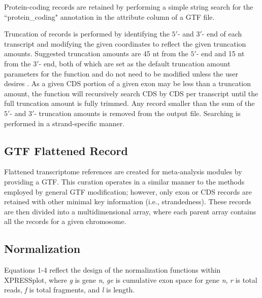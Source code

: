 \documentclass[10pt, oneside]{article}
\begin{document}
Protein-coding records are retained by performing a simple string search for the ``protein\_coding" annotation in the attribute column of a GTF file. \par

Truncation of records is performed by identifying the $5'$- and $3'$- end of each transcript and modifying the given coordinates to reflect the given truncation amounts. Suggested truncation amounts are 45 nt from the $5'$- end and 15 nt from the $3'$- end, both of which are set as the default truncation amount parameters for the function and do not need to be modified unless the user desires \cite{ingolia_meth}. As a given CDS portion of a given exon may be less than a truncation amount, the function will recursively search CDS by CDS per transcript until the full truncation amount is fully trimmed. Any record smaller than the sum of the $5'$- and $3'$- truncation amounts is removed from the output file. Searching is performed in a strand-specific manner. \par

\subsection{GTF Flattened Record}
Flattened transcriptome references are created for meta-analysis modules by providing a GTF. This curation operates in a similar manner to the methods employed by general GTF modification; however, only exon or CDS records are retained with other minimal key information (i.e., strandedness). These records are then divided into a multidimensional array, where each parent array contains all the records for a given chromosome. \par

\subsection{Normalization}
Equations 1-4 reflect the design of the normalization functions within XPRESSplot, where \textit{g} is gene \textit{n}, \textit{ge} is cumulative exon space for gene \textit{n}, \textit{r} is total reads, \textit{f} is total fragments, and \textit{l} is length.
\end{document}
